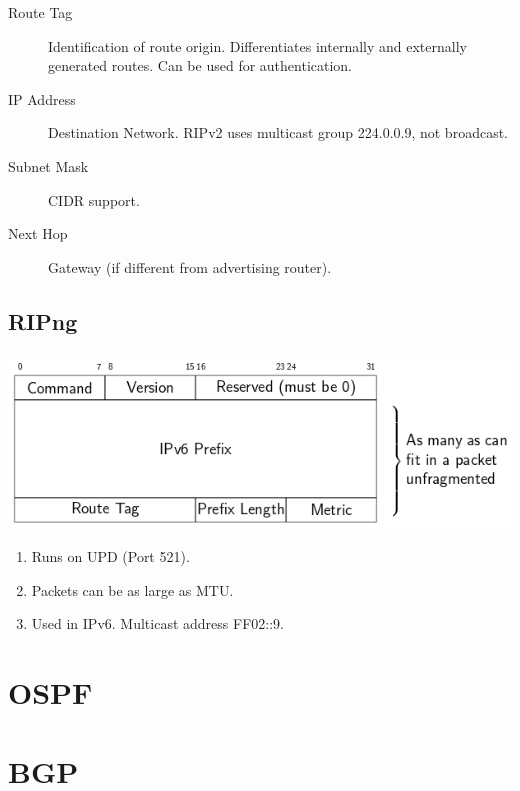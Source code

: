 \documentclass{article}
\begin{document}
\begin{description}
	\item[Route Tag] Identification of route origin. Differentiates internally and externally generated routes. Can be used for authentication.
	\item[IP Address] Destination Network. RIPv2 uses multicast group 224.0.0.9, not broadcast.
	\item[Subnet Mask] CIDR support.
	\item[Next Hop] Gateway (if different from advertising router).
\end{description}



\subsection{RIPng}


\centerline{\includegraphics[scale=0.5]{images/RIPng.png}\\[1cm]}


\begin{enumerate}
	\item Runs on UPD (Port 521).
	\item Packets can be as large as MTU.
	\item Used in IPv6. Multicast address FF02::9.
\end{enumerate}








\newpage

\section{OSPF}











\newpage

\section{BGP}











\newpage


\printbibliography
\end{document}
